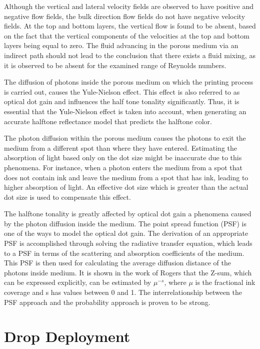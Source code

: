 Although the vertical and lateral velocity fields are observed  to have positive and negative  flow fields, the bulk direction flow fields do not have negative velocity fields. At the top and bottom layers, the vertical flow is found to be absent, based on the fact that the vertical components of the velocities at the top and bottom layers being equal to zero. The fluid advancing in the porous medium via an indirect path should not lead to the  conclusion that there exists a fluid mixing, as it is observed to be absent for the examined range of Reynolds numbers.\citep{hapgood2002drop}

The diffusion of photons inside the porous medium on which the printing process is carried out, causes the Yule-Nielson effect. This effect is also referred to as optical dot gain and influences the half tone tonality significantly. Thus, it is essential that the Yule-Nielson effect is taken into account, when generating an accurate halftone reflectance model that predicts the halftone color.

The photon diffusion within the porous medium causes the photons to exit the medium from a different spot than  where they  have entered. Estimating the absorption of light based only on the dot size might be inaccurate due to this phenomena. For instance, when a photon enters the medium from a spot that does  not contain ink and leave the medium from a spot that has ink, leading to higher absorption of light.
An effective dot size which is greater than the actual dot size is used to compensate this effect.

The halftone tonality is greatly affected by optical dot gain a phenomena caused by the photon diffusion inside the medium. The point spread function (PSF) is one of the ways to model the optical dot gain. The derivation of an appropriate PSF is accomplished through solving the radiative transfer equation, which leads to a PSF in terms of the scattering and absorption coefficients of the medium. This PSF is then used for calculating the average diffusion distance of the photons inside medium. It is shown in the work of Rogers that the Z-sum, which can be expressed explicitly, can be estimated by $\mu^{-s}$, where $\mu$ is the fractional ink coverage and s has values between 0 and 1.  The interrelationship  between the PSF  approach and the probability approach is proven to be strong. \citep{rogers2015point}
\section{Drop Deployment}

